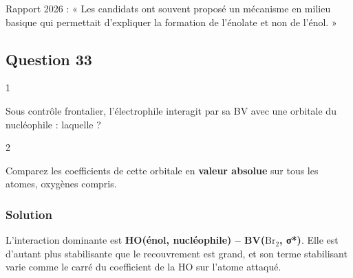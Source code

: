 \documentclass[11pt,a4paper]{article}
\begin{document}
\begin{jury}

Rapport 2026 : « Les candidats ont souvent proposé un mécanisme en milieu basique qui permettait d'expliquer la formation de l'énolate et non de l'énol. »

\end{jury}

\hypertarget{question-33}{%
\subsection{Question 33}\label{question-33}}

\begin{indication}{1}

Sous contrôle frontalier, l'électrophile interagit par sa BV avec une orbitale du nucléophile : laquelle ?

\end{indication}

\begin{indication}{2}

Comparez les coefficients de cette orbitale en \textbf{valeur absolue} sur tous les atomes, oxygènes compris.

\end{indication}

\hypertarget{solution-32}{%
\subsubsection{Solution}\label{solution-32}}

L'interaction dominante est \textbf{HO(énol, nucléophile) -- BV(\(\mathrm{Br_2}\), σ*)}. Elle est d'autant plus stabilisante que le recouvrement est grand, et son terme stabilisant varie comme le carré du coefficient de la HO sur l'atome attaqué.
\end{document}
